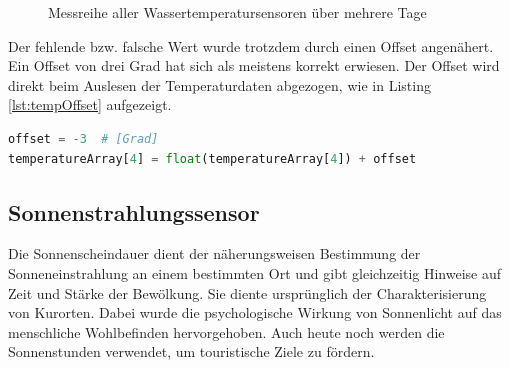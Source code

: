\begin{figure}[htb!]
	\centering
	\caption{Messreihe aller Wassertemperatursensoren über mehrere Tage}
	\label{img:tempSensoren}
\end{figure}

\noindent
Der fehlende bzw. falsche Wert wurde trotzdem durch einen Offset angenähert. Ein Offset von drei Grad hat sich als meistens korrekt erwiesen. Der Offset wird direkt beim Auslesen der Temperaturdaten abgezogen, wie in Listing \ref{lst:tempOffset} aufgezeigt.

\vspace{3mm}
\begin{lstlisting}[label=lst:tempOffset,caption=Offset des defekten Temperatursensors, language=Python, style=py]
offset = -3  # [Grad]
temperatureArray[4] = float(temperatureArray[4]) + offset
\end{lstlisting}


\subsection{Sonnenstrahlungssensor}
Die Sonnenscheindauer dient der näherungsweisen Bestimmung der Sonneneinstrahlung an einem bestimmten Ort und gibt gleichzeitig Hinweise auf Zeit und Stärke der Bewölkung. Sie diente ursprünglich der Charakterisierung von Kurorten. Dabei wurde die psychologische Wirkung von Sonnenlicht auf das menschliche Wohlbefinden hervorgehoben. Auch heute noch werden die Sonnenstunden verwendet, um touristische Ziele zu fördern.

